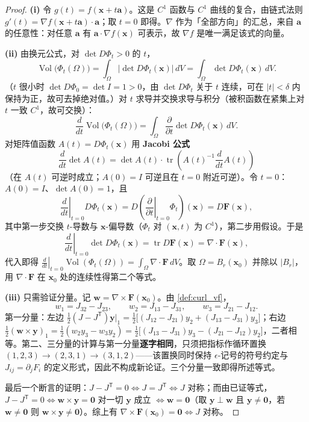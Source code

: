 \begin{proof}
\textbf{(i)} 令 $g(t) = f(\mathbf x+t\mathbf a)$。这是 $C^1$ 函数与 $C^1$ 曲线的复合，由链式法则 $g'(t) = \nabla f(\mathbf x+t\mathbf a)\cdot\mathbf a$；取 $t=0$ 即得。$\nabla$ 作为「全部方向」的汇总，来自 $\mathbf a$ 的任意性：对任意 $\mathbf a$ 有 $\mathbf a\cdot\nabla f(\mathbf x)$ 可表示，故 $\nabla f$ 是唯一满足该式的向量。

\textbf{(ii)} 由换元公式，对 $\det D\Phi_t>0$ 的 $t$，
\[
\operatorname{Vol}\bigl(\Phi_t(\Omega)\bigr) = \int_{\Omega}\bigl|\det D\Phi_t(\mathbf x)\bigr|\,dV = \int_{\Omega}\det D\Phi_t(\mathbf x)\,dV .
\]
（$t$ 很小时 $\det D\Phi_0 = \det I = 1>0$，由 $\det D\Phi_t$ 关于 $t$ 连续，可在 $|t|<\delta$ 内保持为正，故可去掉绝对值。）对 $t$ 求导并交换求导与积分（被积函数在紧集上对 $t$ 一致 $C^1$，故可交换）：
\[
\frac{d}{dt}\operatorname{Vol}\bigl(\Phi_t(\Omega)\bigr) = \int_{\Omega}\frac{\partial}{\partial t}\det D\Phi_t(\mathbf x)\,dV .
\]
对矩阵值函数 $A(t) = D\Phi_t(\mathbf x)$ 用 \textbf{Jacobi 公式}
\[
\frac{d}{dt}\det A(t) = \det A(t)\cdot\operatorname{tr}\!\left(A(t)^{-1}\frac{d}{dt}A(t)\right)
\]
（在 $A(t)$ 可逆时成立；$A(0)=I$ 可逆且在 $t=0$ 附近可逆）。令 $t=0$：$A(0)=I$、$\det A(0)=1$，且
\[
\left.\frac{d}{dt}\right|_{t=0}D\Phi_t(\mathbf x) = D\!\left(\left.\frac{\partial}{\partial t}\right|_{t=0}\Phi_t\right)(\mathbf x) = D\mathbf F(\mathbf x),
\]
其中第一步交换 $t$-导数与 $\mathbf x$-偏导数（$\Phi_t$ 对 $(\mathbf x,t)$ 为 $C^1$），第二步用假设。于是
\[
\left.\frac{d}{dt}\right|_{t=0}\det D\Phi_t(\mathbf x) = \operatorname{tr}D\mathbf F(\mathbf x) = \nabla\cdot\mathbf F(\mathbf x),
\]
代入即得 $\left.\frac{d}{dt}\right|_{t=0}\operatorname{Vol}(\Phi_t(\Omega)) = \int_\Omega\nabla\cdot\mathbf F\,dV$。取 $\Omega = B_r(\mathbf x_0)$ 并除以 $|B_r|$，用 $\nabla\cdot\mathbf F$ 在 $\mathbf x_0$ 处的连续性得第二个等式。

\textbf{(iii)} 只需验证分量。记 $\mathbf w = \nabla\times\mathbf F(\mathbf x_0)$。由 \cref{def:curl_vf}，
\[
w_1 = J_{32}-J_{23},\qquad w_2 = J_{13}-J_{31},\qquad w_3 = J_{21}-J_{12}.
\]
第一分量：左边 $\tfrac12(J-J^{\mathsf T})\mathbf y\big|_1 = \tfrac12\bigl[(J_{12}-J_{21})y_2+(J_{13}-J_{31})y_3\bigr]$；右边 $\tfrac12(\mathbf w\times\mathbf y)_1 = \tfrac12(w_2y_3-w_3y_2) = \tfrac12\bigl[(J_{13}-J_{31})y_3-(J_{21}-J_{12})y_2\bigr]$，二者相等。第二、三分量的计算与第一分量\textbf{逐字相同}，只须把指标作循环置换 $(1,2,3)\to(2,3,1)\to(3,1,2)$——该置换同时保持 $\epsilon$-记号的符号约定与 $J_{ij}=\partial_jF_i$ 的定义形式，因此不构成新论证。三个分量一致即得所述等式。

最后一个断言的证明：$J-J^{\mathsf T}=0 \iff J=J^{\mathsf T}\iff J$ 对称；而由已证等式，$J-J^{\mathsf T}=0 \iff \mathbf w\times\mathbf y=\mathbf 0$ 对一切 $\mathbf y$ 成立 $\iff \mathbf w=\mathbf 0$（取 $\mathbf y\perp\mathbf w$ 且 $\mathbf y\ne\mathbf 0$，若 $\mathbf w\ne\mathbf 0$ 则 $\mathbf w\times\mathbf y\ne\mathbf 0$）。综上有 $\nabla\times\mathbf F(\mathbf x_0)=\mathbf 0 \iff J$ 对称。
\end{proof}

